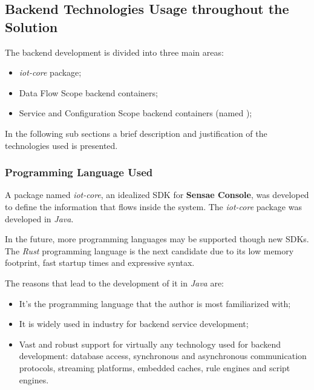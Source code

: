 \subsection{Backend Technologies Usage throughout the Solution}
\label{subsec:implementation:decisions:backend}

The backend development is divided into three main areas:

\begin{itemize}
    \item \textit{iot-core} package;
    \item Data Flow Scope backend containers;
    \item Service and Configuration Scope backend containers (named );
\end{itemize}

In the following sub sections a brief description and justification of the technologies used is presented.

\subsubsection{Programming Language Used}
\label{subsubsec:implementation:decisions:backend:prog}

A package named \textit{iot-core}, an idealized \gls{SDK} for \textbf{Sensae Console}, was developed to define the information that flows inside the system.
The \textit{iot-core} package was developed in \textit{Java}.

In the future, more programming languages may be supported though new \gls{SDK}s. The \textit{Rust} programming language is the next candidate due to its low memory footprint, fast startup times and expressive syntax.

The reasons that lead to the development of it in \textit{Java} are:

\begin{itemize}
    \item It's the programming language that the author is most familiarized with;
    \item It is widely used in industry for backend service development;
    \item Vast and robust support for virtually any technology used for backend development: database access, synchronous and asynchronous communication protocols, streaming platforms, embedded caches, rule engines and script engines.
\end{itemize}

